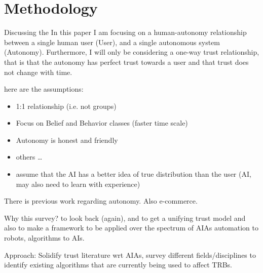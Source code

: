 \section{Methodology} \label{sec:methodology}
    Discussing the 
    In this paper I am focusing on a human-autonomy relationship between a single human user (User), and a single autonomous system (Autonomy). Furthermore, I will only be considering a one-way trust relationship, that is that the autonomy has perfect trust towards a user and that trust does not change with time. 

    here are the assumptions:

    \begin{itemize}
        \item 1:1 relationship (i.e. not groups)
        \item Focus on Belief and Behavior classes (faster time scale)
        \item Autonomy is honest and friendly
        \item others \ldots
        \item assume that the AI has a better idea of true distribution than the user (AI, may also need to learn with experience)
    \end{itemize}

    There is previous work regarding autonomy. Also e-commerce.

    Why this survey? to look back (again), and to get a unifying trust model and also to make a framework to be applied over the spectrum of  AIAs automation to robots, algorithms to AIs.

    Approach: Solidify trust literature wrt AIAs, survey different fields/disciplines to identify existing algorithms that are currently being used to affect TRBs.
